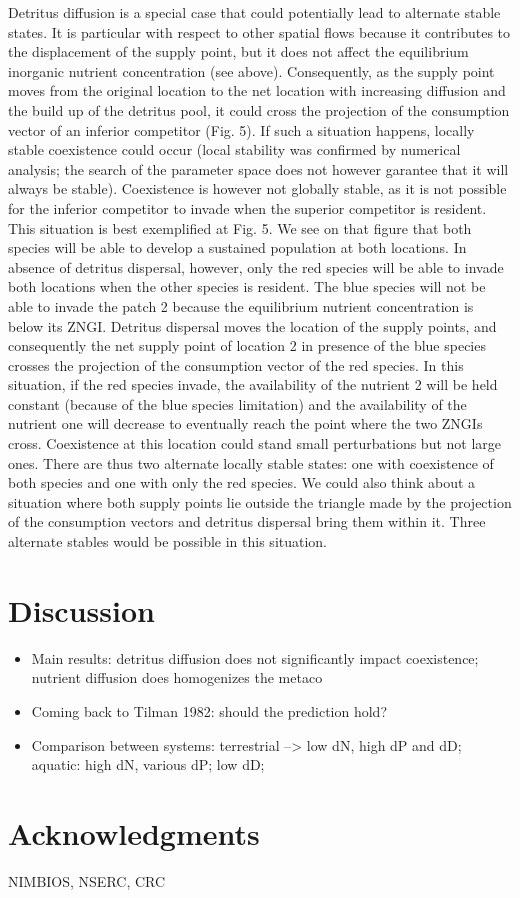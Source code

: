 \documentclass[letterpaper,twocolumn,showkeys]{revtex4-1}
\begin{document}
Detritus diffusion is a special case that could potentially lead to alternate stable states. It is particular with respect to other spatial flows because it contributes to the displacement of the supply point, but it does not affect the equilibrium inorganic nutrient concentration (see above). Consequently, as the supply point moves from the original location to the net location with increasing diffusion and the build up of the detritus pool, it could cross the projection of the consumption vector of an inferior competitor (Fig. 5). If such a situation happens, locally stable coexistence could occur (local stability was confirmed by numerical analysis; the search of the parameter space does not however garantee that it will always be stable). Coexistence is however not globally stable, as it is not possible for the inferior competitor to invade when the superior competitor is resident. This situation is best exemplified at Fig. 5. We see on that figure that both species will be able to develop a sustained population at both locations. In absence of detritus dispersal, however, only the red species will be able to invade both locations when the other species is resident. The blue species will not be able to invade the patch 2 because the equilibrium nutrient concentration is below its ZNGI. Detritus dispersal moves the location of the supply points, and consequently the net supply point of location 2 in presence of the blue species crosses the projection of the consumption vector of the red species. In this situation, if the red species invade, the availability of the nutrient 2 will be held constant (because of the blue species limitation) and the availability of the nutrient one will decrease to eventually reach the point where the two ZNGIs cross. Coexistence at this location could stand small perturbations but not large ones. There are thus two alternate locally stable states: one with coexistence of both species and one with only the red species. We could also think about a situation where both supply points lie outside the triangle made by the projection of the consumption vectors and detritus dispersal bring them within it. Three alternate stables would be possible in this situation. 

\section{Discussion}

\begin{itemize}
\item Main results: detritus diffusion does not significantly impact coexistence; nutrient diffusion does homogenizes the metaco

\item Coming back to Tilman 1982: should the prediction hold?

\item Comparison between systems: terrestrial --> low dN, high dP and dD; aquatic: high dN, various dP; low dD;
\end{itemize}


\section{Acknowledgments}
NIMBIOS, NSERC, CRC
\end{document}
